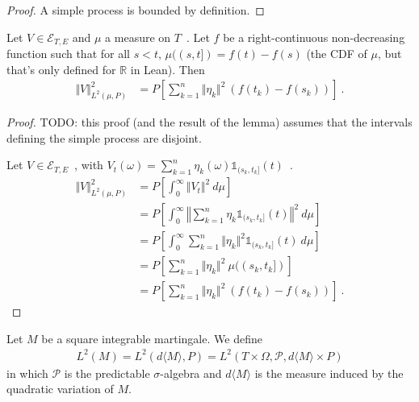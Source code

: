 \begin{proof}
A simple process is bounded by definition.
\end{proof}


\begin{lemma}\label{lem:L2Predictable.sq_norm_simpleProcess}
Let $V \in \mathcal{E}_{T, E}$ and $\mu$ a measure on $T$~.
Let $f$ be a right-continuous non-decreasing function such that for all $s < t$, $\mu((s,t]) = f(t) - f(s)$ (the CDF of $\mu$, but that's only defined for $\mathbb{R}$ in Lean).
Then
\begin{align*}
  \Vert V \Vert^2_{L^2(\mu, P)}
  &= P\left[ \sum_{k=1}^n \Vert \eta_k \Vert^2 \: (f(t_k) - f(s_k)) \right]
  \: .
\end{align*}
\end{lemma}

\begin{proof}
TODO: this proof (and the result of the lemma) assumes that the intervals defining the simple process are disjoint.

Let $V \in \mathcal{E}_{T, E}$~, with $V_t(\omega) = \sum_{k=1}^n \eta_k(\omega) \mathbb{1}_{(s_k, t_k]}(t)$~.
\begin{align*}
  \Vert V \Vert^2_{L^2(\mu, P)}
  &= P\left[ \int_0^{\infty} \Vert V_t \Vert^2 \: d\mu \right]
  \\
  &= P\left[ \int_0^{\infty} \left\Vert \sum_{k=1}^n \eta_k \mathbb{1}_{(s_k, t_k]}(t) \right\Vert^2 \: d\mu \right]
  \\
  &= P\left[ \int_0^{\infty} \sum_{k=1}^n \Vert \eta_k \Vert^2 \mathbb{1}_{(s_k, t_k]}(t) \: d\mu \right]
  \\
  &= P\left[ \sum_{k=1}^n \Vert \eta_k \Vert^2 \: \mu((s_k, t_k]) \right]
  \\
  &= P\left[ \sum_{k=1}^n \Vert \eta_k \Vert^2 \: (f(t_k) - f(s_k)) \right]
  \: .
\end{align*}
\end{proof}


\begin{definition}\label{def:L2M}
Let $M$ be a square integrable martingale. We define
\begin{align*}
  L^2(M)
  = L^2(d\langle M \rangle, P)
  = L^2(T \times \Omega, \mathcal{P}, d\langle M \rangle \times P)
\end{align*}
in which $\mathcal{P}$ is the predictable $\sigma$-algebra and $d\langle M \rangle$ is the measure induced by the quadratic variation of $M$.
\end{definition}



